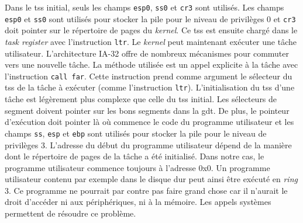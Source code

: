 Dans le \acrshort{tss} initial, seuls les champs \texttt{esp0},
\texttt{ss0} et \texttt{cr3} sont utilisés. Les champs
\texttt{esp0} et \texttt{ss0} sont utilisés pour stocker
la pile pour le niveau de privilèges 0 et \texttt{cr3} doit pointer
sur le répertoire de pages du \textit{kernel}. Ce \acrshort{tss} est ensuite chargé
dans le \textit{task register} avec l'instruction \texttt{ltr}. Le
\textit{kernel} peut maintenant exécuter une tâche utilisateur. L'architecture
\acrshort{IA-32} offre de nombreux mécanismes pour commuter vers une nouvelle
tâche. La méthode utilisée est un appel explicite à la tâche avec l'instruction
\texttt{call far}. Cette instruction prend comme argument le sélecteur
du \acrshort{tss} de la tâche à exécuter (comme l'instruction \texttt{ltr}).
L'initialisation du \acrshort{tss} d'une tâche est légèrement plus complexe que
celle du \acrshort{tss} initial. Les sélecteurs de segment doivent pointer sur les
bons segments dans la \acrshort{gdt}. De plus, le pointeur d'exécution doit
pointer là où commence le code du programme utilisateur et les champs \texttt{ss},
\texttt{esp} et \texttt{ebp} sont utilisés pour stocker la pile
pour le niveau de privilèges 3. L'adresse du début du programme utilisateur dépend
de la manière dont le répertoire de pages de la tâche a été initialisé. Dans notre
cas, le programme utilisateur commence toujours à l'adresse 0x0. Un programme
utilisateur contenu par exemple dans le disque dur peut ainsi être exécuté en
\textit{ring} 3. Ce programme ne pourrait par contre pas faire grand chose car
il n'aurait le droit d'accéder ni aux périphériques, ni à la mémoire. Les appels
systèmes permettent de résoudre ce problème.


